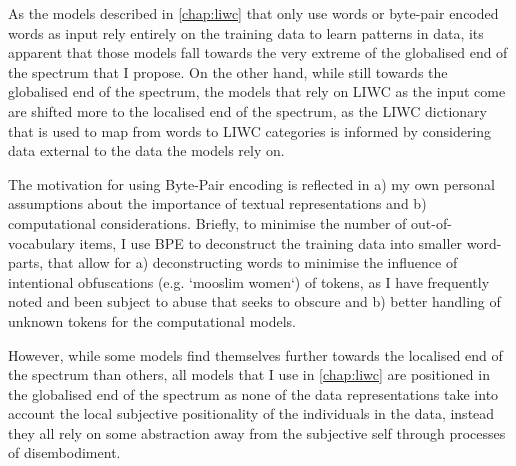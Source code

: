 As the models described in \autoref{chap:liwc} that only use words or byte-pair encoded words as input rely entirely on the training data to learn patterns in data, its apparent that those models fall towards the very extreme of the globalised end of the spectrum that I propose. On the other hand, while still towards the globalised end of the spectrum, the models that rely on LIWC as the input come are shifted more to the localised end of the spectrum, as the LIWC dictionary that is used to map from words to LIWC categories is informed by considering data external to the data the models rely on.


The motivation for using Byte-Pair encoding is reflected in a) my own personal assumptions about the importance of textual representations and b) computational considerations. Briefly, to minimise the number of out-of-vocabulary items, I use BPE to deconstruct the training data into smaller word-parts, that allow for a) deconstructing words to minimise the influence of intentional obfuscations (e.g. `mooslim women`) of tokens, as I have frequently noted and been subject to abuse that seeks to obscure  and b) better handling of unknown tokens for the computational models.

However, while some models find themselves further towards the localised end of the spectrum than others, all models that I use in \autoref{chap:liwc} are positioned in the globalised end of the spectrum as none of the data representations take into account the local subjective positionality of the individuals in the data, instead they all rely on some abstraction away from the subjective self through processes of disembodiment.

